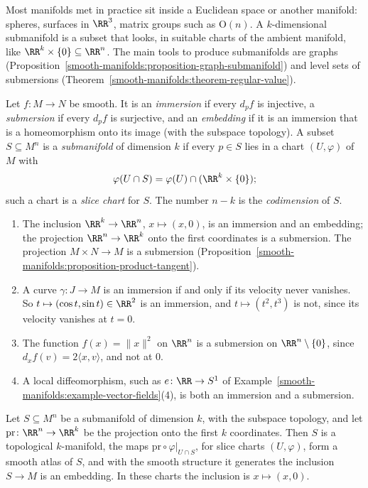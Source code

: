 Most manifolds met in practice sit inside a Euclidean space or another manifold: spheres, surfaces in $\RR^3$, matrix groups such as $\mathrm{O}(n)$. A
$k$-dimensional submanifold is a subset that looks, in suitable charts of the ambient manifold, like $\RR^k \times \{0\} \subseteq \RR^n$. The main tools
to produce submanifolds are graphs (Proposition~\ref{smooth-manifolds:proposition-graph-submanifold}) and level sets of submersions
(Theorem~\ref{smooth-manifolds:theorem-regular-value}).

\begin{definition}\label{smooth-manifolds:definition-immersion}
Let $f \colon M \to N$ be smooth. It is an \emph{immersion} if every $d_pf$ is injective, a \emph{submersion} if every $d_pf$ is surjective, and an
\emph{embedding} if it is an immersion that is a homeomorphism onto its image (with the subspace topology). A subset $S \subseteq M^n$ is a
\emph{submanifold} of dimension $k$ if every $p \in S$ lies in a chart $(U, \varphi)$ of $M$ with
\[
\varphi(U \cap S) = \varphi(U) \cap (\RR^k \times \{0\});
\]
such a chart is a \emph{slice chart} for $S$. The number $n - k$ is the \emph{codimension} of $S$.
\end{definition}

\begin{example}\label{smooth-manifolds:example-immersions}
\begin{enumerate}
\item The inclusion $\RR^k \to \RR^n$, $x \mapsto (x, 0)$, is an immersion and an embedding; the projection $\RR^n \to \RR^k$ onto the first coordinates is a
submersion. The projection $M \times N \to M$ is a submersion (Proposition~\ref{smooth-manifolds:proposition-product-tangent}).
\item A curve $\gamma \colon J \to M$ is an immersion if and only if its velocity never vanishes. So $t \mapsto (\cos t, \sin t) \in \RR^2$ is an immersion,
and $t \mapsto (t^2, t^3)$ is not, since its velocity vanishes at $t = 0$.
\item The function $f(x) = \|x\|^2$ on $\RR^n$ is a submersion on $\RR^n \setminus \{0\}$, since $d_xf(v) = 2\langle x, v\rangle$, and not at $0$.
\item A local diffeomorphism, such as $e \colon \RR \to S^1$ of Example~\ref{smooth-manifolds:example-vector-fields}(4), is both an immersion and a
submersion.
\end{enumerate}
\end{example}

\begin{lemma}\label{smooth-manifolds:lemma-submanifold-structure}
Let $S \subseteq M^n$ be a submanifold of dimension $k$, with the subspace topology, and let $\mathrm{pr} \colon \RR^n \to \RR^k$ be the projection onto the
first $k$ coordinates. Then $S$ is a topological $k$-manifold, the maps $\mathrm{pr} \circ \varphi|_{U \cap S}$, for slice charts $(U, \varphi)$, form a smooth
atlas of $S$, and with the smooth structure it generates the inclusion $S \to M$ is an embedding. In these charts the inclusion is $x \mapsto (x, 0)$.
\end{lemma}

